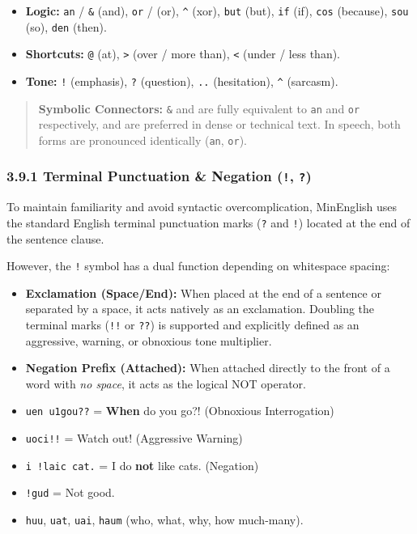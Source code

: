\begin{itemize}
\tightlist
\item
  \textbf{Logic:} \texttt{an} / \texttt{\&} (and), \texttt{or} /
  \texttt{\textbar{}} (or), \texttt{\^{}} (xor), \texttt{but} (but),
  \texttt{if} (if), \texttt{cos} (because), \texttt{sou} (so),
  \texttt{den} (then).
\item
  \textbf{Shortcuts:} \texttt{@} (at), \texttt{\textgreater{}} (over /
  more than), \texttt{\textless{}} (under / less than).
\item
  \textbf{Tone:} \texttt{!} (emphasis), \texttt{?} (question),
  \texttt{..} (hesitation), \texttt{\^{}} (sarcasm).
\end{itemize}

\begin{quote}
\textbf{Symbolic Connectors:} \texttt{\&} and \texttt{\textbar{}} are
fully equivalent to \texttt{an} and \texttt{or} respectively, and are
preferred in dense or technical text. In speech, both forms are
pronounced identically (\texttt{an}, \texttt{or}).
\end{quote}

\subsubsection{\texorpdfstring{3.9.1 Terminal Punctuation \& Negation
(\texttt{!},
\texttt{?})}{3.9.1 Terminal Punctuation \& Negation (!, ?)}}\label{terminal-punctuation-negation}

To maintain familiarity and avoid syntactic overcomplication, MinEnglish
uses the standard English terminal punctuation marks (\texttt{?} and
\texttt{!}) located at the end of the sentence clause.

However, the \texttt{!} symbol has a dual function depending on
whitespace spacing:

\begin{itemize}
\item
  \textbf{Exclamation (Space/End):} When placed at the end of a sentence
  or separated by a space, it acts natively as an exclamation. Doubling
  the terminal marks (\texttt{!!} or \texttt{??}) is supported and
  explicitly defined as an aggressive, warning, or obnoxious tone
  multiplier.
\item
  \textbf{Negation Prefix (Attached):} When attached directly to the
  front of a word with \emph{no space}, it acts as the logical NOT
  operator.
\item
  \texttt{uen\ u1gou??} = \textbf{When} do you go?! (Obnoxious
  Interrogation)
\item
  \texttt{uoci!!} = Watch out! (Aggressive Warning)
\item
  \texttt{i\ !laic\ cat.} = I do \textbf{not} like cats. (Negation)
\item
  \texttt{!gud} = Not good.
\item
  \texttt{huu}, \texttt{uat}, \texttt{uai}, \texttt{haum} (who, what,
  why, how much-many).
\end{itemize}

